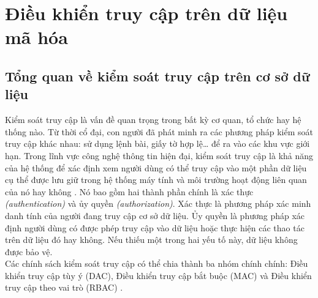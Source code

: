 \chapter{Điều khiển truy cập trên dữ liệu mã hóa}

\section{Tổng quan về kiểm soát truy cập trên cơ sở dữ liệu}

Kiểm soát truy cập là vấn đề quan trọng trong bất kỳ cơ quan, tổ chức hay hệ
thống nào. Từ thời cổ đại, con người đã phát minh ra các phương pháp kiểm soát truy
cập khác nhau: sử dụng lệnh bài, giấy tờ hợp lệ… để ra vào các khu vực giới hạn. Trong
lĩnh vực công nghệ thông tin hiện đại, kiểm soát truy cập là khả năng của hệ thống để
xác định xem người dùng có thể truy cập vào một phần dữ liệu cụ thể được lưu giữ trong
hệ thống máy tính và môi trường hoạt động liên quan của nó hay không \cite{emms1987definition}. Nó bao gồm
hai thành phần chính là xác thực \textit{(authentication)} và ủy quyền \textit{(authorization)}. Xác thực
là phương pháp xác minh danh tính của người đang truy cập cơ sở dữ liệu. Ủy quyền là
phương pháp xác định người dùng có được phép truy cập vào dữ liệu hoặc thực hiện các
thao tác trên dữ liệu đó hay không. Nếu thiếu một trong hai yếu tố này, dữ liệu không
được bảo vệ. \\
\indent Các chính sách kiểm soát truy cập có thể chia thành ba nhóm chính chính: Điều
khiển truy cập tùy ý (DAC), Điều khiển truy cập bắt buộc (MAC) và Điều khiển truy cập
theo vai trò (RBAC) \cite{sandhu1996role}.
